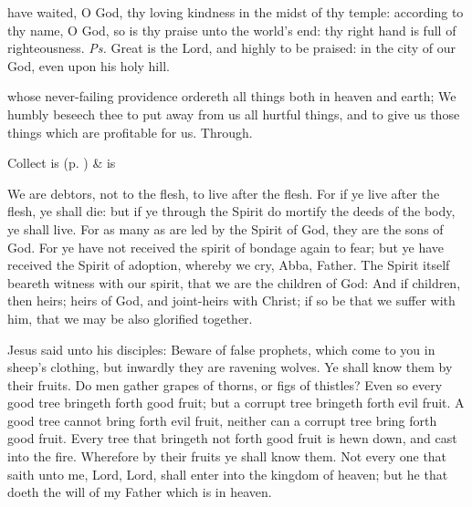 
\introit
{} have waited, O God, thy loving kindness in the midst of thy temple: according to thy name, O God, so is thy praise unto the world's end: thy right hand is full of righteousness. \textit{Ps.} Great is the Lord, and highly to be praised: in the city of our God, even upon his holy hill.

\collect
{} whose never-failing providence ordereth all things both in heaven and earth; We humbly beseech thee to put away from us all hurtful things, and to give us those things which are profitable for us. Through.
\begin{rubric}
     Collect is  (p. \pageref{SPSaints}) \&  is 
\end{rubric}

 We are debtors, not to the flesh, to live after the flesh. For if ye live after the flesh, ye shall die: but if ye through the Spirit do mortify the deeds of the body, ye shall live. For as many as are led by the Spirit of God, they are the sons of God. For ye have not received the spirit of bondage again to fear; but ye have received the Spirit of adoption, whereby we cry, Abba, Father. The Spirit itself beareth witness with our spirit, that we are the children of God: And if children, then heirs; heirs of God, and joint-heirs with Christ; if so be that we suffer with him, that we may be also glorified together.



\clearpage
{}
 Jesus said unto his disciples: Beware of false prophets, which come to you in sheep's clothing, but inwardly they are ravening wolves. Ye shall know them by their fruits. Do men gather grapes of thorns, or figs of thistles? Even so every good tree bringeth forth good fruit; but a corrupt tree bringeth forth evil fruit. A good tree cannot bring forth evil fruit, neither can a corrupt tree bring forth good fruit. Every tree that bringeth not forth good fruit is hewn down, and cast into the fire. Wherefore by their fruits ye shall know them. Not every one that saith unto me, Lord, Lord, shall enter into the kingdom of heaven; but he that doeth the will of my Father which is in heaven.


